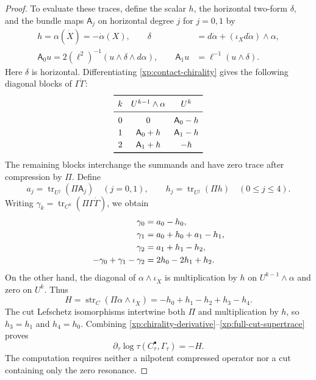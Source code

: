 \documentclass[11pt,letterpaper,reqno]{amsart}
\theoremstyle{remark}
\newcommand{\tr}{\operatorname{tr}}
\begin{document}
\begin{proof}
To evaluate these traces, define the scalar $h$, the horizontal
two-form $\delta$, and the bundle maps $\mathsf A_j$ on horizontal
degree $j$ for $j=0,1$ by
\begin{equation}\label{xp:chirality-bundle-maps}
 \begin{aligned}
 h=\alpha(\dot X)=-\dot\alpha(X),
 \qquad
 \delta&=d\dot\alpha+(\iota_Xd\dot\alpha)\wedge\alpha,\\
 \mathsf A_0u=2(\ell^2)^{-1}(u\wedge\delta\wedge d\alpha),
 \qquad \mathsf A_1u&=\ell^{-1}(u\wedge\delta).
 \end{aligned}
\end{equation}
Here \(\delta\) is horizontal.  Differentiating
\eqref{xp:contact-chirality} gives the following diagonal blocks
of \(\Gamma\dot\Gamma\):
\[
 \renewcommand{\arraystretch}{1.2}
 \begin{array}{ccc}
 \toprule
 k&U^{k-1}\wedge\alpha&U^k\\ \midrule
 0&0&\mathsf A_0-h\\
 1&\mathsf A_0+h&\mathsf A_1-h\\
 2&\mathsf A_1+h&-h\\ \bottomrule
 \end{array}
\]
The remaining blocks interchange the summands and have zero trace
after compression by \(\Pi\).  Define
\[
 a_j=\tr_{U^j}(\Pi \mathsf A_j)\quad(j=0,1),
 \qquad h_j=\tr_{U^j}(\Pi h)\quad(0\leq j\leq4).
\]
Writing \(\gamma_k=\tr_{C^k}(\Pi\Gamma\dot\Gamma)\), we obtain
\begin{align}\label{xp:chirality-trace-cancellation}
 \gamma_0&=a_0-h_0,\\
 \gamma_1&=a_0+h_0+a_1-h_1,\notag\\
 \gamma_2&=a_1+h_1-h_2,\notag\\
 -\gamma_0+\gamma_1-\gamma_2
      &=2h_0-2h_1+h_2.\notag
\end{align}
On the other hand, the diagonal of
\(\alpha\wedge\iota_{\dot X}\) is multiplication by \(h\)
on \(U^{k-1}\wedge\alpha\) and zero on \(U^k\).  Thus
\begin{equation}\label{xp:full-cut-supertrace}
 H=\operatorname{str}_C(\Pi\alpha\wedge\iota_{\dot X})
   =-h_0+h_1-h_2+h_3-h_4.
\end{equation}
The cut Lefschetz isomorphisms intertwine both \(\Pi\) and
multiplication by \(h\), so \(h_3=h_1\) and \(h_4=h_0\).
Combining \eqref{xp:chirality-derivative}--\eqref{xp:full-cut-supertrace}
proves
\begin{equation}\label{torsionvariation}
 \partial_\tau\log\tau(C^\bullet_\tau,\Gamma_\tau)=-H.
\end{equation}
The computation requires neither a nilpotent compressed operator nor
a cut containing only the zero resonance.


\end{proof}
\end{document}
